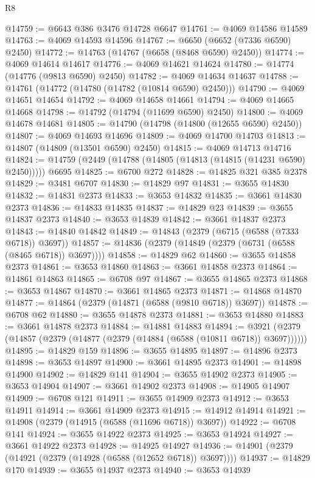 \begin{lexlean}{R8}
\begin{coremodule}
@14759 := @6643 @386 @3476 @14728 @6647
@14761 := @4069 @14586 @14589
@14763 := @4069 @14593 @14596
@14767 := @6650 (@6652 (@7336 @6590) @2450)
@14772 := @14763 (@14767 (@6658 (@8468 @6590) @2450))
@14774 := @4069 @14614 @14617
@14776 := @4069 @14621 @14624
@14780 := @14774 (@14776 (@9813 @6590) @2450)
@14782 := @4069 @14634 @14637
@14788 := @14761 (@14772 (@14780 (@14782 (@10814 @6590) @2450)))
@14790 := @4069 @14651 @14654
@14792 := @4069 @14658 @14661
@14794 := @4069 @14665 @14668
@14798 := @14792 (@14794 (@11699 @6590) @2450)
@14800 := @4069 @14678 @14681
@14805 := @14790 (@14798 (@14800 (@12655 @6590) @2450))
@14807 := @4069 @14693 @14696
@14809 := @4069 @14700 @14703
@14813 := @14807 (@14809 (@13501 @6590) @2450)
@14815 := @4069 @14713 @14716
@14824 := @14759 (@2449 (@14788 (@14805 (@14813 (@14815 (@14231 @6590) @2450))))) @6695
@14825 := @6700 @272
@14828 := @14825 @321 @385 @2378
@14829 := @3481 @6707
@14830 := @14829 @97
@14831 := @3655 @14830
@14832 := @14831 @2373
@14833 := @3653 @14832
@14835 := @3661 @14830 @2373
@14836 := @14833 @14835
@14837 := @14829 @23
@14839 := @3655 @14837 @2373
@14840 := @3653 @14839
@14842 := @3661 @14837 @2373
@14843 := @14840 @14842
@14849 := @14843 (@2379 (@6715 (@6588 (@7333 @6718)) @3697))
@14857 := @14836 (@2379 (@14849 (@2379 (@6731 (@6588 (@8465 @6718)) @3697))))
@14858 := @14829 @62
@14860 := @3655 @14858 @2373
@14861 := @3653 @14860
@14863 := @3661 @14858 @2373
@14864 := @14861 @14863
@14865 := @6708 @97
@14867 := @3655 @14865 @2373
@14868 := @3653 @14867
@14870 := @3661 @14865 @2373
@14871 := @14868 @14870
@14877 := @14864 (@2379 (@14871 (@6588 (@9810 @6718)) @3697))
@14878 := @6708 @62
@14880 := @3655 @14878 @2373
@14881 := @3653 @14880
@14883 := @3661 @14878 @2373
@14884 := @14881 @14883
@14894 := @3921 (@2379 (@14857 (@2379 (@14877 (@2379 (@14884 (@6588 (@10811 @6718)) @3697))))))
@14895 := @14829 @159
@14896 := @3655 @14895
@14897 := @14896 @2373
@14898 := @3653 @14897
@14900 := @3661 @14895 @2373
@14901 := @14898 @14900
@14902 := @14829 @141
@14904 := @3655 @14902 @2373
@14905 := @3653 @14904
@14907 := @3661 @14902 @2373
@14908 := @14905 @14907
@14909 := @6708 @121
@14911 := @3655 @14909 @2373
@14912 := @3653 @14911
@14914 := @3661 @14909 @2373
@14915 := @14912 @14914
@14921 := @14908 (@2379 (@14915 (@6588 (@11696 @6718)) @3697))
@14922 := @6708 @141
@14924 := @3655 @14922 @2373
@14925 := @3653 @14924
@14927 := @3661 @14922 @2373
@14928 := @14925 @14927
@14936 := @14901 (@2379 (@14921 (@2379 (@14928 (@6588 (@12652 @6718)) @3697))))
@14937 := @14829 @170
@14939 := @3655 @14937 @2373
@14940 := @3653 @14939

\end{coremodule}
\end{lexlean}
